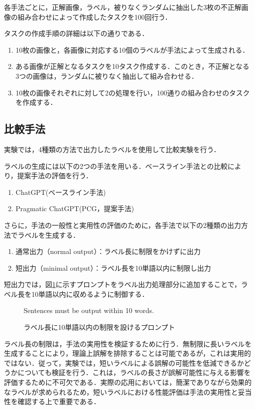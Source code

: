 \documentclass[a4paper,11pt]{jreport}
\begin{document}
各手法ごとに，正解画像，ラベル，被りなくランダムに抽出した3枚の不正解画像の組み合わせによって作成したタスクを100回行う．

タスクの作成手順の詳細は以下の通りである．
\begin{enumerate}
  \item 10枚の画像と，各画像に対応する10個のラベルが手法によって生成される．
  \item ある画像が正解となるタスクを10タスク作成する．このとき，不正解となる3つの画像は，ランダムに被りなく抽出して組み合わせる．
  \item 10枚の画像それぞれに対して2の処理を行い，100通りの組み合わせのタスクを作成する．
\end{enumerate}

\subsection{比較手法}

実験では，4種類の方法で出力したラベルを使用して比較実験を行う．

ラベルの生成には以下の2つの手法を用いる．ベースライン手法との比較により，提案手法の評価を行う．
\begin{enumerate}
    \item ChatGPT(ベースライン手法)
    \item Pragmatic ChatGPT(PCG，提案手法)
\end{enumerate}

さらに，手法の一般性と実用性の評価のために，各手法で以下の2種類の出力方法でラベルを生成する．
\begin{enumerate}
  \item 通常出力（normal output）：ラベル長に制限をかけずに出力
  \item 短出力（minimal output）：ラベル長を10単語以内に制限し出力
\end{enumerate}

短出力では，図\ref{fig:limiting_prompt}に示すプロンプトをラベル出力処理部分に追加することで，ラベル長を10単語以内に収めるように制御する．

\begin{figure}[H]
\begin{mdframed}[linewidth=1pt]
Sentences must be output within 10 words.
\end{mdframed}
\caption{ラベル長に10単語以内の制限を設けるプロンプト}
\label{fig:limiting_prompt}
\end{figure}


ラベル長の制限は，手法の実用性を検証するために行う．無制限に長いラベルを生成することにより，理論上誤解を排除することは可能であるが，これは実用的ではない．従って，実験では，短いラベルによる誤解の可能性を低減できるかどうかについても検証を行う．これは，ラベルの長さが誤解可能性に与える影響を評価するために不可欠である．実際の応用においては，簡潔でありながら効果的なラベルが求められるため，短いラベルにおける性能評価は手法の実用性と妥当性を確認する上で重要である．
\end{document}
